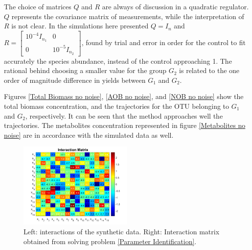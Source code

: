 \documentclass[3p,times]{elsarticle}
\begin{document}
The choice of matrices $Q$ and $R$ are always of discussion in a quadratic regulator. $Q$ represents the covariance matrix of measurements, while the interpretation of $R$ is not clear. In the simulations here presented $Q = I_n$ and $R = \begin{bmatrix}
10^{-4}I_{n_1} & 0 \\ 0 & 10^{-5}I_{n_2}
\end{bmatrix}$, found by trial and error in order for the control to fit accurately the species abundance, instead of the control approaching 1. The rational behind choosing a smaller value for the group $G_2$ is related to the one order of magnitude difference in yields between $G_1$ and $G_2$.


Figures \ref{Total Biomass no noise}, \ref{AOB no noise}, and \ref{NOB no noise} show the total biomass concentration, and the trajectories for the OTU belonging to $G_1$ and $G_2$, respectively. It can be seen that the method approaches well the trajectories. The metabolites concentration represented in figure \ref{Metabolites no noise} are in accordance with the simulated data as well. 
\begin{figure}[h]
	\centering	
	\includegraphics[width=0.5\textwidth]{Synthetic_data_no_noise//Interactions_synthetic_data_no_noise}
	\caption{Left: interactions of the synthetic data. Right: Interaction matrix obtained from solving problem \eqref{Parameter Identification}.}
	\label{Comparison Interaction Matrices}
\end{figure}
\end{document}
